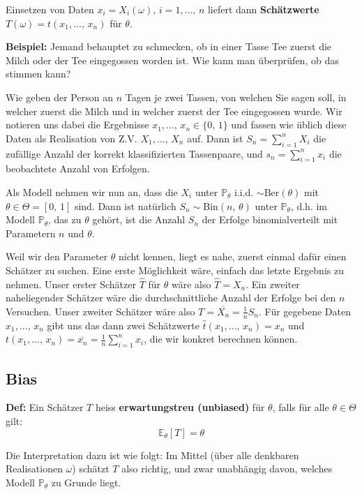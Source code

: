 \documentclass[a4paper]{extarticle}
\begin{document}
Einsetzen von Daten $x_i = X_i(\omega), \, i = 1,..., \, n$ liefert dann \textbf{Schätzwerte} $T(\omega) = t(x_1,..., \, x_n)$ für $\theta$.

\begin{ebox}
    \textbf{Beispiel:} Jemand behauptet zu schmecken, ob in einer Tasse Tee zuerst die Milch oder der Tee eingegossen worden ist. Wie kann man überprüfen, ob das stimmen kann?

    Wie geben der Person an $n$ Tagen je zwei Tassen, von welchen Sie sagen soll, in welcher zuerst die Milch und in welcher zuerst der Tee eingegossen wurde. Wir notieren uns dabei die Ergebnisse $x_1,..., \, x_n \in \{0, \, 1\}$ und fassen wie üblich diese Daten als Realisation von Z.V. $X_1,..., \, X_n$ auf. Dann ist $S_n = \sum_{i = 1}^n X_i$ die zufällige Anzahl der korrekt klassifizierten Tassenpaare, und $s_n = \sum_{i = 1}^n x_i$ die beobachtete Anzahl von Erfolgen.

    Als Modell nehmen wir nun an, dass die $X_i$ unter $\mathbb{P}_{\theta}$ i.i.d. $\sim \text{Ber}(\theta)$ mit $\theta \in \Theta = [0, \, 1]$ sind. Dann ist natürlich $S_n \sim \text{Bin}(n, \, \theta)$ unter $\mathbb{P}_{\theta}$, d.h. im Modell $\mathbb{P}_{\theta}$, das zu $\theta$ gehört, ist die Anzahl $S_n$ der Erfolge binomialverteilt mit Parametern $n$ und $\theta$.

    Weil wir den Parameter $\theta$ nicht kennen, liegt es nahe, zuerst einmal dafür einen Schätzer zu suchen. Eine erste Möglichkeit wäre, einfach das letzte Ergebnis zu nehmen. Unser erster Schätzer $\hat{T}$ für $\theta$ wäre also $\hat{T} = X_n$. Ein zweiter naheliegender Schätzer wäre die durchschnittliche Anzahl der Erfolge bei den $n$ Versuchen. Unser zweiter Schätzer wäre also $T = \bar{X_n} = \frac{1}{n}S_n$. Für gegebene Daten $x_1,..., \, x_n$ gibt uns das dann zwei Schätzwerte $\hat{t}(x_1,..., \, x_n) = x_n$ und $t(x_1,..., \, x_n) = \bar{x_n} = \frac{1}{n}\sum_{i = 1}^nx_i$, die wir konkret berechnen können.
\end{ebox}

\subsection{Bias}

\textbf{Def:} Ein Schätzer $T$ heiss \textbf{erwartungstreu (unbiased)} für $\theta$, falls für alle $\theta \in \Theta$ gilt:
\[
    \mathbb{E}_{\theta}[T] = \theta
\]

Die Interpretation dazu ist wie folgt: Im Mittel (über alle denkbaren Realisationen $\omega$) schätzt $T$ also richtig, und zwar unabhängig davon, welches Modell $\mathbb{P}_{\theta}$ zu Grunde liegt.
\end{document}
